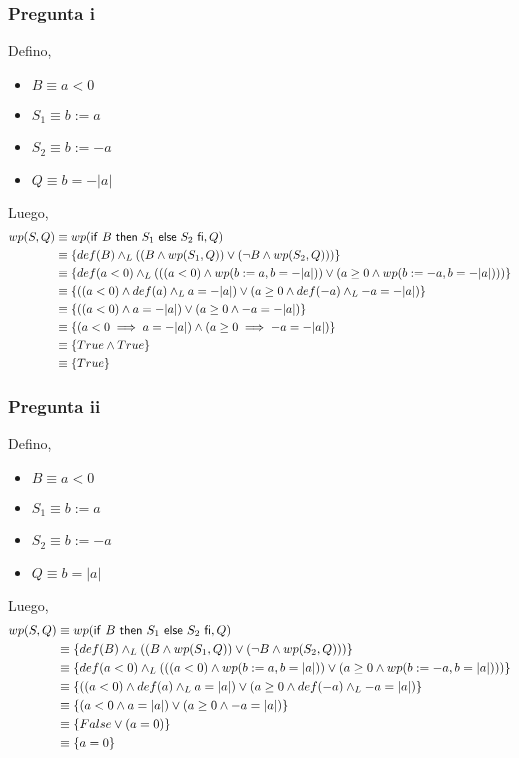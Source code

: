 \subsubsection{Pregunta i}
Defino,
\begin{itemize}
    \item $ B \equiv a < 0 $
    \item $ S_1 \equiv b := a $
    \item $ S_2 \equiv b := -a $
    \item $ Q \equiv b = -|a| $
\end{itemize}
Luego,
\begin{align*}
    wp(S, Q) &\equiv wp(\mathsf{if}\ B\ \mathsf{then}\ S_1\ \mathsf{else}\ S_2\ \mathsf{fi}, Q) \\
    &\equiv \{ def(B) \land _L ((B \wedge wp(S_1, Q)) \vee (\neg B \wedge wp(S_2, Q))) \} \\
    &\equiv \{ def(a < 0) \land _L (((a<0) \wedge wp(b := a, b = -|a|)) \vee (a \geq 0 \wedge wp( b := -a, b = -|a|))) \} \\
    &\equiv \{ ((a<0) \wedge def(a) \land _L a = -|a|) \vee (a \geq 0 \wedge def(-a) \land _L -a = -|a|) \} \\
    &\equiv \{ ((a<0) \wedge a = -|a|) \vee (a \geq 0 \wedge -a = -|a|) \} \\
    &\equiv \{ (a<0 \implies a = -|a|) \wedge (a \geq 0 \implies -a = -|a|) \} \\
    &\equiv \{ True \wedge True \} \\
    &\equiv \{ True \} \\
\end{align*}

\subsubsection{Pregunta ii}
Defino,
\begin{itemize}
    \item $ B \equiv a < 0 $
    \item $ S_1 \equiv b := a $
    \item $ S_2 \equiv b := -a $
    \item $ Q \equiv b = |a| $
\end{itemize}
Luego,
\begin{align*}
    wp(S, Q) &\equiv wp(\mathsf{if}\ B\ \mathsf{then}\ S_1\ \mathsf{else}\ S_2\ \mathsf{fi}, Q) \\
    &\equiv \{ def(B) \land _L ((B \wedge wp(S_1, Q)) \vee (\neg B \wedge wp(S_2, Q))) \} \\
    &\equiv \{ def(a < 0) \land _L (((a<0) \wedge wp(b := a, b = |a|)) \vee (a \geq 0 \wedge wp( b := -a, b = |a|))) \} \\
    &\equiv \{ ((a<0) \wedge def(a) \land _L a = |a|) \vee (a \geq 0 \wedge def(-a) \land _L -a = |a|) \} \\
    &\equiv \{ (a<0 \wedge a = |a|) \vee (a \geq 0 \wedge -a = |a|) \} \\
    &\equiv \{ False \vee (a = 0) \} \\
    &\equiv \{ a = 0 \} \\
\end{align*}

